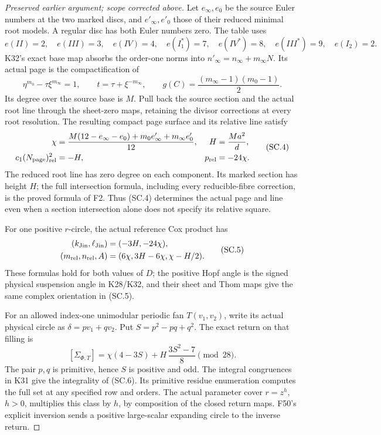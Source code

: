 \begin{proof}[Preserved earlier argument; scope corrected above]
Let \(e_\infty,e_0\) be the source Euler numbers at the two
marked discs, and \(e'_\infty,e'_0\) those of their reduced
minimal root models. A regular disc has both Euler numbers
zero. The table uses
\[
 e(II)=2,\quad e(III)=3,\quad e(IV)=4,\quad
 e(I_1^*)=7,\quad e(IV^*)=8,\quad e(III^*)=9,
 \quad e(I_2)=2.
\]
K32's exact base map absorbs the order-one norms into
\(n'_\infty=n_\infty+m_\infty N\). Its actual page is the
compactification of
\[
 \eta^{m_0}-\tau\xi^{m_\infty}=1,\qquad
 t=\tau+\xi^{-m_\infty},\qquad
 g(C)=\frac{(m_\infty-1)(m_0-1)}2.               \tag{SC.3}
\]
Its degree over the source base is \(M\). Pull back the
source section and the actual root line through the
sheet-zero maps, retaining the divisor corrections
at every root resolution. The resulting compact page
surface and its relative line satisfy
\[
 \begin{aligned}
 \chi&=\frac{M(12-e_\infty-e_0)
                 +m_0e'_\infty+m_\infty e'_0}{12},
 &H&=\frac{Ma^2}{d},\\
 c_1(N_{\rm page})_{\rm rel}^2&=-H,
 &p_{\rm rel}&=-24\chi.
 \end{aligned}                                  \tag{SC.4}
\]
The reduced root line has zero degree on each component.
Its marked section has height \(H\); the full intersection
formula, including every reducible-fibre correction,
is the proved formula of F2. Thus (SC.4) determines the
actual page and line even when a section intersection
alone does not specify its relative square.

For one positive \(r\)-circle, the actual reference Cox
product has
\[
 \begin{split}
 (k_{\rm Jin},\ell_{\rm Jin})&=(-3H,-24\chi),\\
 (m_{\rm rel},n_{\rm rel},A)&=
           (6\chi,3H-6\chi,\chi-H/2).
 \end{split}                                   \tag{SC.5}
\]
These formulas hold for both values of \(D\); the positive
Hopf angle is the signed physical suspension angle in
K28/K32, and their sheet and Thom maps give the same
complex orientation in (SC.5).

For an allowed index-one unimodular periodic fan
\(T(v_1,v_2)\), write its actual physical circle as
\(\delta=pv_1+qv_2\). Put \(S=p^2-pq+q^2\).
The exact return on that filling is
\[
 [\Sigma_{\Phi,T}]
       =\chi(4-3S)+H\,\frac{3S^2-7}{8}
                   \pmod {28}.                 \tag{SC.6}
\]
The pair \(p,q\) is primitive, hence \(S\) is positive
and odd. The integral congruences in K31 give the
integrality of (SC.6). Its primitive residue enumeration
computes the full set at any specified row and orders.
The actual parameter cover \(r=z^h\), \(h>0\), multiplies
this class by \(h\), by composition of the closed
return maps. F50's explicit inversion sends a positive
large-scalar expanding circle to the inverse return.


\end{proof}

